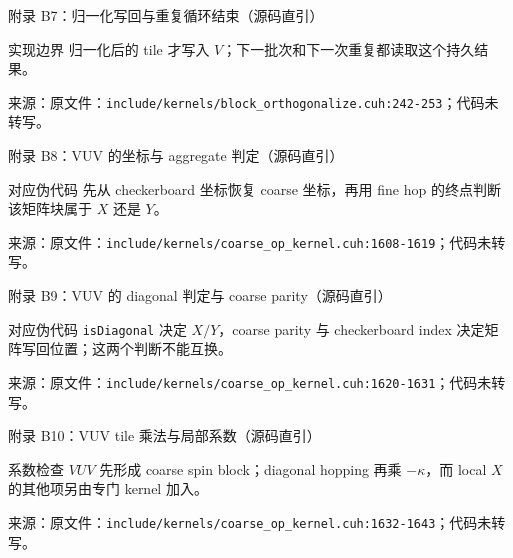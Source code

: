 \documentclass[UTF8,aspectratio=169,11pt]{ctexbeamer}
\newcommand{\source}[1]{\vspace{0.05em}\par{\raggedright\scriptsize\color{muted}来源：#1\par}}
\newcommand{\codepath}[1]{\nolinkurl{#1}}
\begin{document}
\begin{frame}[fragile,t]{附录 B7：归一化写回与重复循环结束（源码直引）}
  
  \begin{alertblock}{实现边界}
    归一化后的 tile 才写入 \(V\)；下一批次和下一次重复都读取这个持久结果。
  \end{alertblock}
  \source{原文件：\codepath{include/kernels/block_orthogonalize.cuh:242-253}；代码未转写。}
\end{frame}

\begin{frame}[fragile,t]{附录 B8：VUV 的坐标与 aggregate 判定（源码直引）}
  
  \begin{block}{对应伪代码}
    先从 checkerboard 坐标恢复 coarse 坐标，再用 fine hop 的终点判断该矩阵块属于 \(X\) 还是 \(Y\)。
  \end{block}
  \source{原文件：\codepath{include/kernels/coarse_op_kernel.cuh:1608-1619}；代码未转写。}
\end{frame}

\begin{frame}[fragile,t]{附录 B9：VUV 的 diagonal 判定与 coarse parity（源码直引）}
  
  \begin{block}{对应伪代码}
    \texttt{isDiagonal} 决定 \(X/Y\)，coarse parity 与 checkerboard index 决定矩阵写回位置；这两个判断不能互换。
  \end{block}
  \source{原文件：\codepath{include/kernels/coarse_op_kernel.cuh:1620-1631}；代码未转写。}
\end{frame}

\begin{frame}[fragile,t]{附录 B10：VUV tile 乘法与局部系数（源码直引）}
  
  \begin{alertblock}{系数检查}
    \(VUV\) 先形成 coarse spin block；diagonal hopping 再乘 \(-\kappa\)，而 local \(X\) 的其他项另由专门 kernel 加入。
  \end{alertblock}
  \source{原文件：\codepath{include/kernels/coarse_op_kernel.cuh:1632-1643}；代码未转写。}
\end{frame}
\end{document}
